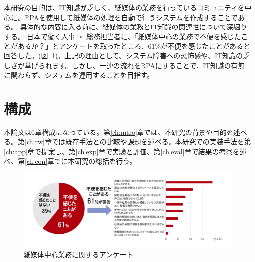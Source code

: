 本研究の目的は、IT知識が乏しく、紙媒体の業務を行っているコミュニティを中心に。RPAを使用して紙媒体の処理を自動で行うシステムを作成することである。
具体的な内容に入る前に、紙媒体の業務とIT知識の関連性について深堀りする。
日本で働く人事 ・ 総務担当者に、「紙媒体中心の業務で不便を感じたことがあるか？」とアンケートを取ったところ、61\%が不便を感じたことがあると回答した。(図~\ref{fig:paper_media_survey})。上記の理由として、システム障害への恐怖感や、IT知識の乏しさが挙げられます。しかし、一連の流れをRPAにすることで、IT知識の有無に関わらず、システムを運用することを目指す。

\section{構成}
\label{sec_str}

本論文は6章構成になっている。第\ref{ch:intro}章では、本研究の背景や目的を述べる。第\ref{ch:rw}章では既存手法との比較や課題を述べる。本研究での実装手法を第\ref{ch:app}章で提案し、第\ref{ch:exp}章で実験と評価、第\ref{ch:eval}章で結果の考察を述べ、第\ref{ch:con}章でに本研究の総括を行う。

\begin{figure}[htbp]
\vspace{1cm}
\centering
\includegraphics[scale = 0.6]{img/paper_media_survey.pdf}
\caption{紙媒体中心業務に関するアンケート}
\label{fig:paper_media_survey}
\end{figure}%

